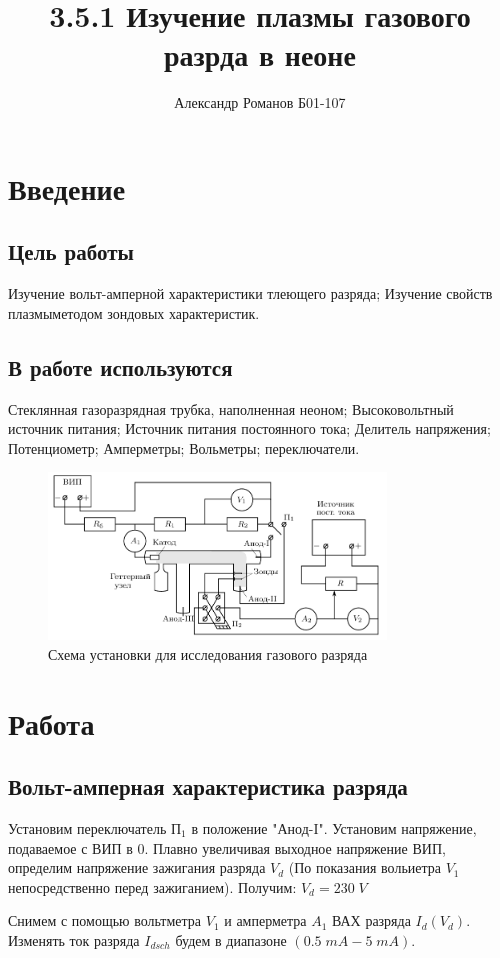 \documentclass{article}
\author{Александр Романов Б01-107}
\date{}
\title{3.5.1 Изучение плазмы газового разрда в неоне}
\begin{document}
\maketitle
\section{Введение}
\subsection{Цель работы}
Изучение вольт-амперной характеристики тлеющего разряда; Изучение свойств плазмыметодом зондовых
характеристик.
\subsection{В работе используются} 
Стеклянная газоразрядная трубка, наполненная неоном; Высоковольтный источник питания; Источник
питания постоянного тока; Делитель напряжения; Потенциометр; Амперметры; Вольметры; переключатели.
\begin{figure}[H]
    \centering
    \includegraphics[width=0.8\textwidth]{sheme.png}
    \caption{Схема установки для исследования газового разряда}
\end{figure}

\section{Работа}
\subsection{Вольт-амперная характеристика разряда}
Установим переключатель \(\text{П}_1\) в положение "Анод-I". Установим напряжение, подаваемое с ВИП в 0.
Плавно увеличивая выходное напряжение ВИП, определим напряжение зажигания разряда \(V_{d}\) (По
показания вольиетра \(V_1\) непосредственно перед зажиганием). Получим: \(V_{d} = 230\; V\)

Снимем с помощью вольтметра \(V_1\) и амперметра \(A_1\) ВАХ разряда \(I_{d}\left(V_{d}\right)\). 
Изменять ток разряда \(I_{dsch}\) будем в диапазоне \(\left(0.5\; mA - 5\; mA\right)\). 
\end{document}
